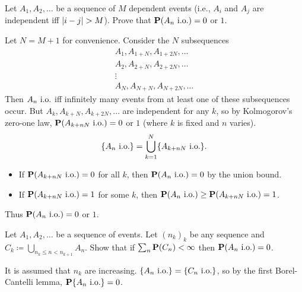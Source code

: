 \documentclass[12pt]{article}
\begin{document}
\begin{problem*}
    Let $A_1, A_2, \dots$ be a sequence of $M$ dependent events
    (i.e., $A_i$ and $A_j$ are independent iff $\abs{i - j} > M$).
    Prove that $\P(A_n \io) = 0$ or $1$.
\end{problem*}
\begin{solution}
    Let $N = M + 1$ for convenience.
    Consider the $N$ subsequences \begin{gather*}
        A_1, A_{1+N}, A_{1+2N}, \dots \\
        A_2, A_{2+N}, A_{2+2N}, \dots \\
        \vdots \\
        A_N, A_{N+N}, A_{N+2N}, \dots
    \end{gather*}
    Then $A_n \io$ iff infinitely many events from at least
    one of these subsequences occur.
    But $A_k, A_{k+N}, A_{k+2N}, \dots$ are independent for any $k$,
    so by Kolmogorov's zero-one law, $\P(A_{k+nN} \io) = 0$ or $1$
    (where $k$ is fixed and $n$ varies).
    \[
        \set{A_n \io} = \bigcup_{k=1}^N \set{A_{k+nN} \io}.
    \]
    \begin{itemize}
        \item If $\P(A_{k+nN} \io) = 0$ for all $k$, then $\P(A_n \io) = 0$
        by the union bound.
        \item If $\P(A_{k+nN} \io) = 1$ for some $k$,
        then $\P(A_n \io) \ge \P(A_{k+nN} \io) = 1$.
    \end{itemize}
    Thus $\P(A_n \io) = 0$ or $1$.
\end{solution}

\begin{problem*}
    Let $A_1, A_2, \dots$ be a sequence of events.
    Let $(n_k)_k$ be any sequence and
    $C_k \coloneq \bigcup_{n_k \le n < n_{k+1}} A_n$.
    Show that if $\sum_n \P(C_n) < \infty$ then $\P(A_n \io) = 0$.
\end{problem*}
\begin{solution}
    It is assumed that $n_k$ are increasing.
    $\set{A_n \io} = \set{C_n \io}$, so by the first Borel-Cantelli lemma,
    $\P\set{A_n \io} = 0$.
\end{solution}
\end{document}
